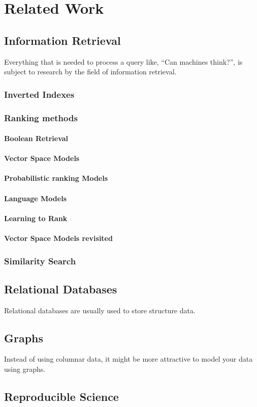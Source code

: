 \chapter{Related Work}

\section{Information Retrieval}
Everything that is needed to process a query like, ``Can machines think?'', is subject to research by the field of information retrieval. 

\subsection{Inverted Indexes}

\subsection{Ranking methods}

\subsubsection{Boolean Retrieval}
\subsubsection{Vector Space Models}
\subsubsection{Probabilistic ranking Models}
\subsubsection{Language Models}
\subsubsection{Learning to Rank}
\subsubsection{Vector Space Models revisited}

\subsection{Similarity Search}

\section{Relational Databases}
Relational databases are usually used to store structure data. 

\section{Graphs}
Instead of using columnar data, it might be more attractive to model your data using graphs. 

\section{Reproducible Science}